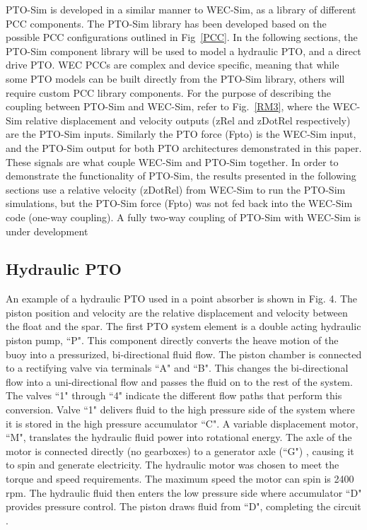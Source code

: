 \documentclass[twocolumn,10pt]{asme2e}
\begin{document}
PTO-Sim is developed in a similar manner to WEC-Sim, as a library of different PCC components. The PTO-Sim library has been developed based on the possible PCC configurations outlined in Fig~\ref{PCC}. In the following sections, the PTO-Sim component library will be used to model a hydraulic PTO, and a direct drive PTO. WEC PCCs are complex and device specific, meaning that while some PTO models can be built directly from the PTO-Sim library, others will require custom PCC library components. For the purpose of describing the coupling between PTO-Sim and WEC-Sim, refer to Fig.~\ref{RM3}, where the WEC-Sim relative displacement and velocity outputs (zRel and zDotRel respectively) are the PTO-Sim inputs. Similarly the PTO force (Fpto) is the WEC-Sim input, and the PTO-Sim output for both PTO architectures demonstrated in this paper.  These signals are what couple WEC-Sim and PTO-Sim together. In order to demonstrate the functionality of PTO-Sim, the results presented in the following sections use a relative velocity (zDotRel) from WEC-Sim to run the PTO-Sim simulations, but the PTO-Sim force (Fpto) was not fed back into the WEC-Sim code (one-way coupling). A fully two-way coupling of PTO-Sim with WEC-Sim is under development



\subsection*{Hydraulic PTO}
An example of a hydraulic PTO used in a point absorber is shown in Fig. 4.  The piston position and velocity are the relative displacement and velocity between the float and the spar. The first PTO system element is a double acting hydraulic piston pump, ``P". This component directly converts the heave motion of the buoy into a pressurized, bi-directional fluid flow. The piston chamber is connected to a rectifying valve via terminals ``A" and ``B". This changes the bi-directional flow into a uni-directional flow and passes the fluid on to the rest of the system. The valves ``1" through ``4" indicate the different flow paths that perform this conversion. Valve ``1" delivers fluid to the high pressure side of the system where it is stored in the high pressure accumulator ``C". A variable displacement motor, ``M", translates the hydraulic fluid power into rotational energy. The axle of the motor is connected directly (no gearboxes) to a generator axle (``G") , causing it to spin and generate electricity. The hydraulic motor was chosen to meet the torque and speed requirements. The maximum speed the motor can spin is 2400 rpm.
The hydraulic fluid then enters the low pressure side where accumulator ``D" provides pressure control. The piston draws fluid from ``D", completing the circuit \cite{casey2013modeling}.
\end{document}
